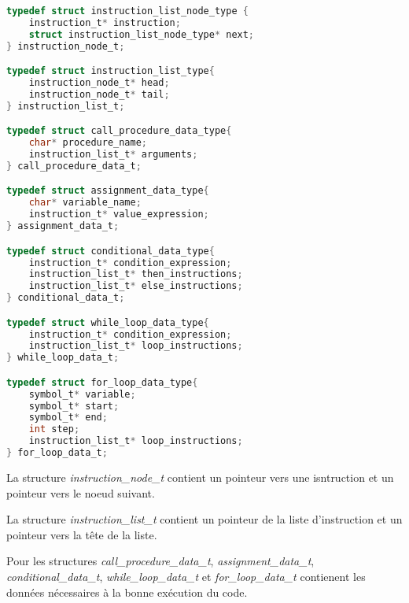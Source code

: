 \lstset{style=mystyle}
\begin{lstlisting}[language=C, caption=Structure pour une liste instruction]
typedef struct instruction_list_node_type {
    instruction_t* instruction;
    struct instruction_list_node_type* next;
} instruction_node_t;

typedef struct instruction_list_type{
    instruction_node_t* head;
    instruction_node_t* tail;
} instruction_list_t;

typedef struct call_procedure_data_type{
    char* procedure_name;
    instruction_list_t* arguments;
} call_procedure_data_t;

typedef struct assignment_data_type{
    char* variable_name;
    instruction_t* value_expression;
} assignment_data_t;

typedef struct conditional_data_type{
    instruction_t* condition_expression;
    instruction_list_t* then_instructions;
    instruction_list_t* else_instructions;
} conditional_data_t;

typedef struct while_loop_data_type{
    instruction_t* condition_expression;
    instruction_list_t* loop_instructions;
} while_loop_data_t;

typedef struct for_loop_data_type{
    symbol_t* variable;
    symbol_t* start;
    symbol_t* end;
    int step;
    instruction_list_t* loop_instructions;
} for_loop_data_t;
\end{lstlisting}

La structure \textit{instruction\_node\_t} contient un pointeur vers une isntruction et un pointeur vers le noeud suivant.
 
La structure \textit{instruction\_list\_t} contient un pointeur de la liste d'instruction et un pointeur vers la tête de la liste.

Pour les structures \textit{call\_procedure\_data\_t}, \textit{assignment\_data\_t}, \textit{conditional\_data\_t}, \textit{while\_loop\_data\_t} et \textit{for\_loop\_data\_t} contienent les données nécessaires à la bonne exécution du code.

\newpage